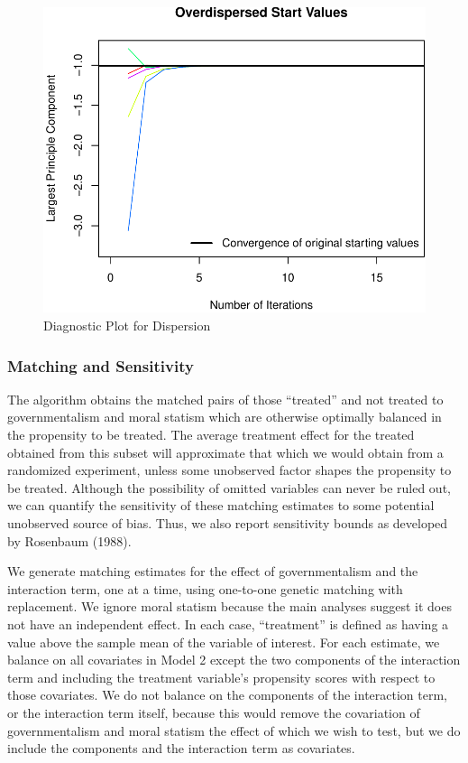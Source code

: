 \documentclass[12pt,]{article}
\begin{document}
\begin{figure}[htbp]
\centering
\includegraphics{figures/missing6-1.pdf}
\caption{Diagnostic Plot for Dispersion}
\end{figure}

\subsubsection{Matching and Sensitivity}\label{matching-and-sensitivity}

The algorithm obtains the matched pairs of those ``treated'' and not
treated to governmentalism and moral statism which are otherwise
optimally balanced in the propensity to be treated. The average
treatment effect for the treated obtained from this subset will
approximate that which we would obtain from a randomized experiment,
unless some unobserved factor shapes the propensity to be treated.
Although the possibility of omitted variables can never be ruled out, we
can quantify the sensitivity of these matching estimates to some
potential unobserved source of bias. Thus, we also report sensitivity
bounds as developed by Rosenbaum (1988).

We generate matching estimates for the effect of governmentalism and the
interaction term, one at a time, using one-to-one genetic matching with
replacement. We ignore moral statism because the main analyses suggest
it does not have an independent effect. In each case, ``treatment'' is
defined as having a value above the sample mean of the variable of
interest. For each estimate, we balance on all covariates in Model 2
except the two components of the interaction term and including the
treatment variable's propensity scores with respect to those covariates.
We do not balance on the components of the interaction term, or the
interaction term itself, because this would remove the covariation of
governmentalism and moral statism the effect of which we wish to test,
but we do include the components and the interaction term as covariates.
\end{document}
